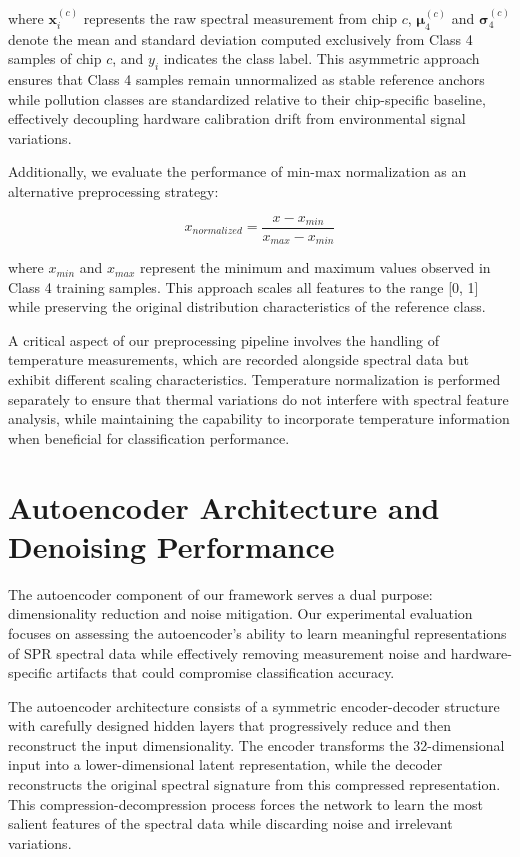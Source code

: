 where $\mathbf{x}^{(c)}_i$ represents the raw spectral measurement from chip $c$, $\boldsymbol{\mu}^{(c)}_4$ and $\boldsymbol{\sigma}^{(c)}_4$ denote the mean and standard deviation computed exclusively from Class 4 samples of chip $c$, and $y_i$ indicates the class label. This asymmetric approach ensures that Class 4 samples remain unnormalized as stable reference anchors while pollution classes are standardized relative to their chip-specific baseline, effectively decoupling hardware calibration drift from environmental signal variations.

Additionally, we evaluate the performance of min-max normalization as an alternative preprocessing strategy:

\begin{equation}
x_{normalized} = \frac{x - x_{min}}{x_{max} - x_{min}}
\end{equation}

where $x_{min}$ and $x_{max}$ represent the minimum and maximum values observed in Class 4 training samples. This approach scales all features to the range [0, 1] while preserving the original distribution characteristics of the reference class.

A critical aspect of our preprocessing pipeline involves the handling of temperature measurements, which are recorded alongside spectral data but exhibit different scaling characteristics. Temperature normalization is performed separately to ensure that thermal variations do not interfere with spectral feature analysis, while maintaining the capability to incorporate temperature information when beneficial for classification performance.

\section{Autoencoder Architecture and Denoising Performance}
\label{sec:autoencoder_evaluation}

The autoencoder component of our framework serves a dual purpose: dimensionality reduction and noise mitigation. Our experimental evaluation focuses on assessing the autoencoder's ability to learn meaningful representations of SPR spectral data while effectively removing measurement noise and hardware-specific artifacts that could compromise classification accuracy.

The autoencoder architecture consists of a symmetric encoder-decoder structure with carefully designed hidden layers that progressively reduce and then reconstruct the input dimensionality. The encoder transforms the 32-dimensional input into a lower-dimensional latent representation, while the decoder reconstructs the original spectral signature from this compressed representation. This compression-decompression process forces the network to learn the most salient features of the spectral data while discarding noise and irrelevant variations.

